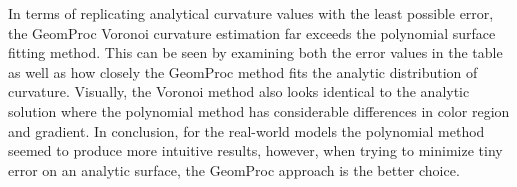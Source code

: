 \documentclass{article}
\begin{document}
In terms of replicating analytical curvature values with the least possible
error, the GeomProc Voronoi curvature estimation far exceeds the polynomial
surface fitting method. This can be seen by examining both the error values in
the table as well as how closely the GeomProc method fits the analytic
distribution of curvature. Visually, the Voronoi method also looks identical to
the analytic solution where the polynomial method has considerable differences
in color region and gradient. In conclusion, for the real-world models the
polynomial method seemed to produce more intuitive results, however, when trying
to minimize tiny error on an analytic surface, the GeomProc approach is the
better choice. 
\end{document}

